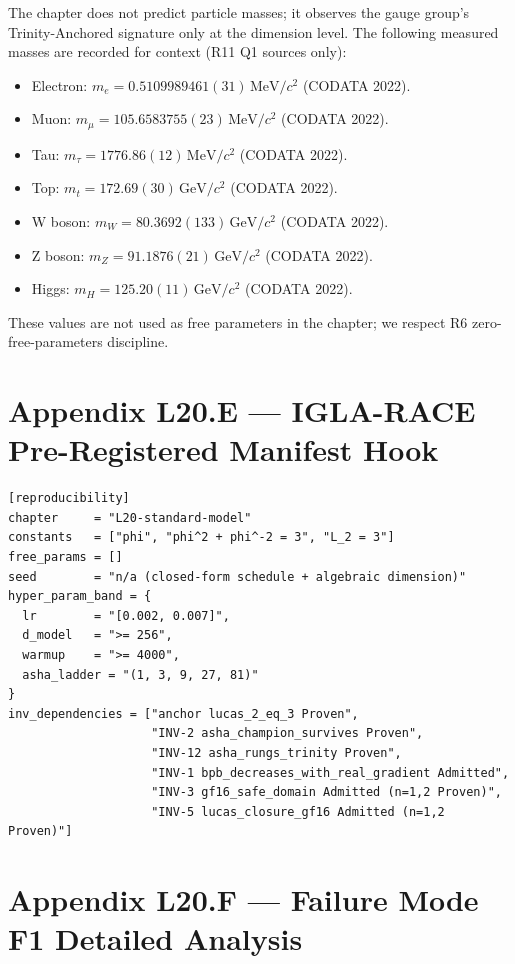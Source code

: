 The chapter does not predict particle masses; it observes the gauge
group's Trinity-Anchored signature only at the dimension level. The
following measured masses are recorded for context (R11 Q1 sources only):
\begin{itemize}
  \item Electron: $m_{e} = 0.5109989461(31)\,\mathrm{MeV}/c^{2}$ (CODATA 2022).
  \item Muon: $m_{\mu} = 105.6583755(23)\,\mathrm{MeV}/c^{2}$ (CODATA 2022).
  \item Tau: $m_{\tau} = 1776.86(12)\,\mathrm{MeV}/c^{2}$ (CODATA 2022).
  \item Top: $m_{t} = 172.69(30)\,\mathrm{GeV}/c^{2}$ (CODATA 2022).
  \item W boson: $m_{W} = 80.3692(133)\,\mathrm{GeV}/c^{2}$ (CODATA 2022).
  \item Z boson: $m_{Z} = 91.1876(21)\,\mathrm{GeV}/c^{2}$ (CODATA 2022).
  \item Higgs: $m_{H} = 125.20(11)\,\mathrm{GeV}/c^{2}$ (CODATA 2022).
\end{itemize}

These values are not used as free parameters in the chapter; we
respect R6 zero-free-parameters discipline.

\section{Appendix L20.E — IGLA-RACE Pre-Registered Manifest Hook}
\label{sec:l20-appendix-E}

\begin{verbatim}
[reproducibility]
chapter     = "L20-standard-model"
constants   = ["phi", "phi^2 + phi^-2 = 3", "L_2 = 3"]
free_params = []
seed        = "n/a (closed-form schedule + algebraic dimension)"
hyper_param_band = {
  lr        = "[0.002, 0.007]",
  d_model   = ">= 256",
  warmup    = ">= 4000",
  asha_ladder = "(1, 3, 9, 27, 81)"
}
inv_dependencies = ["anchor lucas_2_eq_3 Proven",
                    "INV-2 asha_champion_survives Proven",
                    "INV-12 asha_rungs_trinity Proven",
                    "INV-1 bpb_decreases_with_real_gradient Admitted",
                    "INV-3 gf16_safe_domain Admitted (n=1,2 Proven)",
                    "INV-5 lucas_closure_gf16 Admitted (n=1,2 Proven)"]
\end{verbatim}

\section{Appendix L20.F — Failure Mode F1 Detailed Analysis}
\label{sec:l20-appendix-F}

